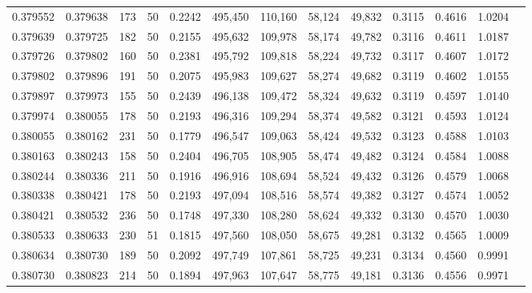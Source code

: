 \begin{tabular}{rrrrrrrrrrrrr}
0.379552 & 0.379638 &   173 &  50 &                                     0.2242 & 495,450 & 110,160 &  58,124 &  49,832 & 0.3115 & 0.4616 & 1.0204 \\
0.379639 & 0.379725 &   182 &  50 &                                     0.2155 & 495,632 & 109,978 &  58,174 &  49,782 & 0.3116 & 0.4611 & 1.0187 \\
0.379726 & 0.379802 &   160 &  50 &                                     0.2381 & 495,792 & 109,818 &  58,224 &  49,732 & 0.3117 & 0.4607 & 1.0172 \\
0.379802 & 0.379896 &   191 &  50 &                                     0.2075 & 495,983 & 109,627 &  58,274 &  49,682 & 0.3119 & 0.4602 & 1.0155 \\
0.379897 & 0.379973 &   155 &  50 &                                     0.2439 & 496,138 & 109,472 &  58,324 &  49,632 & 0.3119 & 0.4597 & 1.0140 \\
0.379974 & 0.380055 &   178 &  50 &                                     0.2193 & 496,316 & 109,294 &  58,374 &  49,582 & 0.3121 & 0.4593 & 1.0124 \\
0.380055 & 0.380162 &   231 &  50 &                                     0.1779 & 496,547 & 109,063 &  58,424 &  49,532 & 0.3123 & 0.4588 & 1.0103 \\
0.380163 & 0.380243 &   158 &  50 &                                     0.2404 & 496,705 & 108,905 &  58,474 &  49,482 & 0.3124 & 0.4584 & 1.0088 \\
0.380244 & 0.380336 &   211 &  50 &                                     0.1916 & 496,916 & 108,694 &  58,524 &  49,432 & 0.3126 & 0.4579 & 1.0068 \\
0.380338 & 0.380421 &   178 &  50 &                                     0.2193 & 497,094 & 108,516 &  58,574 &  49,382 & 0.3127 & 0.4574 & 1.0052 \\
0.380421 & 0.380532 &   236 &  50 &                                     0.1748 & 497,330 & 108,280 &  58,624 &  49,332 & 0.3130 & 0.4570 & 1.0030 \\
0.380533 & 0.380633 &   230 &  51 &                                     0.1815 & 497,560 & 108,050 &  58,675 &  49,281 & 0.3132 & 0.4565 & 1.0009 \\
0.380634 & 0.380730 &   189 &  50 &                                     0.2092 & 497,749 & 107,861 &  58,725 &  49,231 & 0.3134 & 0.4560 & 0.9991 \\
0.380730 & 0.380823 &   214 &  50 &                                     0.1894 & 497,963 & 107,647 &  58,775 &  49,181 & 0.3136 & 0.4556 & 0.9971 \\

\end{tabular}
